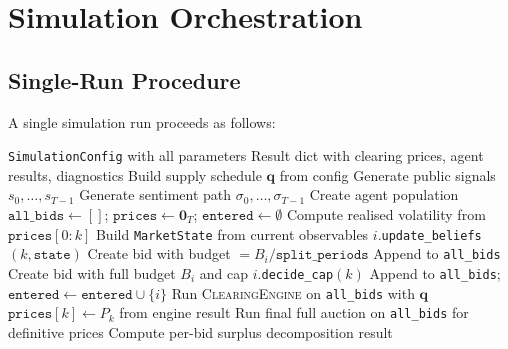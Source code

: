 \documentclass[11pt,a4paper]{article}
\begin{document}
\section{Simulation Orchestration}
\label{sec:orchestration}

\subsection{Single-Run Procedure}
\label{sec:single-run}

A single simulation run proceeds as follows:

\begin{algorithm}[H]
\caption{Single CCA Simulation Run}\label{alg:single-run}
\begin{algorithmic}[1]
\Require \texttt{SimulationConfig} with all parameters
\Ensure Result dict with clearing prices, agent results, diagnostics
\State Build supply schedule $\mathbf{q}$ from config 
\State Generate public signals $s_0,\dots,s_{T-1}$ 
\State Generate sentiment path $\sigma_0,\dots,\sigma_{T-1}$ 
\State Create agent population
\State $\texttt{all\_bids} \gets []$; \; $\texttt{prices} \gets \mathbf{0}_{T}$; \; $\texttt{entered} \gets \emptyset$
  \State Compute realised volatility from $\texttt{prices}[0:k]$
  \State Build \texttt{MarketState} from current observables
    \State $i$.\texttt{update\_beliefs}$(k, \texttt{state})$ 
        \State Create bid with budget $= B_i/\texttt{split\_periods}$
        \State Append to \texttt{all\_bids}
      \EndIf
        \State Create bid with full budget $B_i$ and cap $i$.\texttt{decide\_cap}$(k)$
        \State Append to \texttt{all\_bids}; \; $\texttt{entered} \gets \texttt{entered} \cup \{i\}$
      \EndIf
    \EndIf
  \EndFor
  \State Run \textsc{ClearingEngine} on \texttt{all\_bids} with $\mathbf{q}$ 
  \State $\texttt{prices}[k] \gets P_k$ from engine result
\EndFor
\State Run final full auction on \texttt{all\_bids} for definitive prices
\State Compute per-bid surplus decomposition 
\State \Return result
\end{algorithmic}
\end{algorithm}
\end{document}

